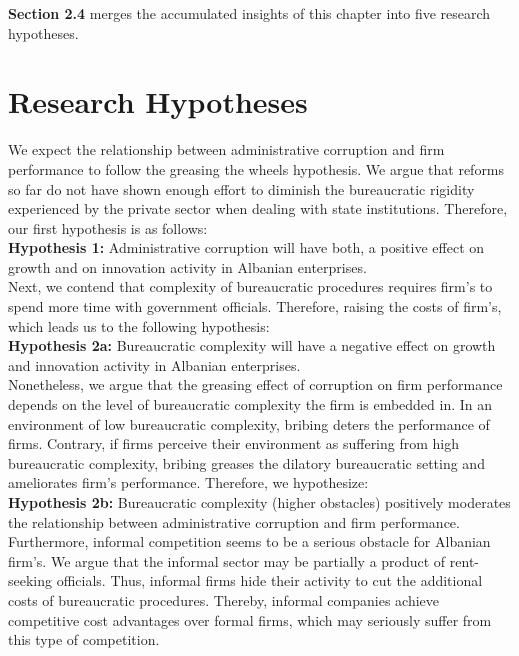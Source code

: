 \textbf{Section 2.4} merges the accumulated insights of this chapter into five research hypotheses.
 
\section{Research Hypotheses}
We expect the relationship between administrative corruption and firm performance to follow the greasing the wheels hypothesis. We argue that reforms so far do not have shown enough effort to diminish the bureaucratic rigidity experienced by the private sector when dealing with state institutions. Therefore, our first hypothesis is as follows:  \\

\textbf{Hypothesis 1:} Administrative corruption will have both, a positive effect on growth and on innovation activity in Albanian enterprises. \\

Next, we contend that complexity of bureaucratic procedures requires firm's to spend more time with government officials. Therefore, raising the costs of firm's, which leads us to the following hypothesis: \\

\textbf{Hypothesis 2a:} Bureaucratic complexity will have a negative effect on growth and innovation activity in Albanian enterprises.\\

Nonetheless, we argue that the greasing effect of corruption on firm performance depends on the level of bureaucratic complexity the firm is embedded in. In an environment of low bureaucratic complexity, bribing deters the performance of firms. Contrary, if firms perceive their environment as suffering from high bureaucratic complexity, bribing greases the dilatory bureaucratic setting and ameliorates firm's performance. Therefore, we hypothesize: \\

\textbf{Hypothesis 2b:} Bureaucratic complexity (higher obstacles) positively moderates the relationship between administrative corruption and firm performance.\\  

Furthermore, informal competition seems to be a serious obstacle for Albanian firm's. We argue that the informal sector may be partially a product of rent-seeking officials. Thus, informal firms hide their activity to cut the additional costs of bureaucratic procedures. Thereby, informal companies achieve competitive cost advantages over formal firms, which may seriously suffer from this type of competition. \\

